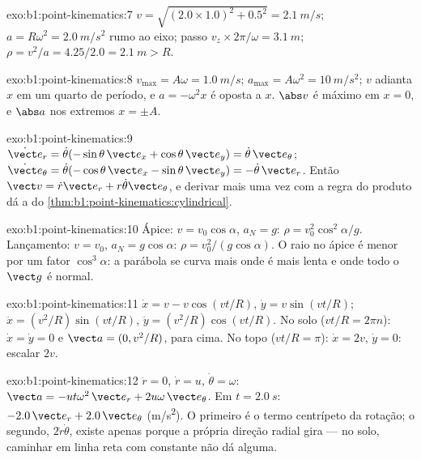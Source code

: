 \begin{solution}{exo:b1:point-kinematics:7}
$v = \sqrt{(2.0 \times 1.0)^2 + 0.5^2} = \qty{2.1}{m/s}$; $a = R\omega^2 =
\qty{2.0}{m/s^2}$ rumo ao eixo; passo $v_z \times 2\pi/\omega =
\qty{3.1}{m}$; $\rho = v^2/a = 4.25/2.0 = \qty{2.1}{m} > R$.
\end{solution}

\begin{solution}{exo:b1:point-kinematics:8}
$v_{\max} = A\omega = \qty{1.0}{m/s}$; $a_{\max} = A\omega^2 = \qty{10}{m/s^2}$;
$v$ adianta $x$ em um quarto de período, e $a = -\omega^2x$ é oposta a $x$.
$\abs v$ é máximo em $x = 0$, e $\abs a$ nos extremos $x = \pm A$.
\end{solution}

\begin{solution}{exo:b1:point-kinematics:9}
$\dot{\vect e}_r = \dot\theta(-\sin\theta\,\vect e_x + \cos\theta\,\vect e_y)
= \dot\theta\,\vect e_\theta$; $\dot{\vect e}_\theta = \dot\theta(-\cos\theta\,
\vect e_x - \sin\theta\,\vect e_y) = -\dot\theta\,\vect e_r$. Então
$\vect v = \dot r\vect e_r + r\dot\theta\vect e_\theta$, e derivar
mais uma vez com a regra do produto dá a  do
\cref{thm:b1:point-kinematics:cylindrical}.
\end{solution}

\begin{solution}{exo:b1:point-kinematics:10}
Ápice: $v = v_0\cos\alpha$, $a_N = g$: $\rho = v_0^2\cos^2\alpha/g$.
Lançamento: $v = v_0$, $a_N = g\cos\alpha$: $\rho = v_0^2/(g\cos\alpha)$.
O raio no ápice é menor por um fator $\cos^3\alpha$: a parábola se curva mais
onde é mais lenta e onde todo o $\vect g$ é normal.
\end{solution}

\begin{solution}{exo:b1:point-kinematics:11}
$\dot x = v - v\cos(vt/R)$, $\dot y = v\sin(vt/R)$; $\ddot x = (v^2/R)
\sin(vt/R)$, $\ddot y = (v^2/R)\cos(vt/R)$. No solo ($vt/R = 2\pi n$):
$\dot x = \dot y = 0$ e $\vect a = (0, v^2/R)$, para cima. No topo
($vt/R = \pi$): $\dot x = 2v$, $\dot y = 0$:  escalar $2v$.
\end{solution}

\begin{solution}{exo:b1:point-kinematics:12}
$\ddot r = 0$, $\dot r = u$, $\dot\theta = \omega$: $\vect a = -ut\omega^2\,
\vect e_r + 2u\omega\,\vect e_\theta$. Em $t = \qty{2.0}{s}$: $-2.0\,\vect e_r
+ 2.0\,\vect e_\theta$ (\unit{m/s^2}). O primeiro é o termo centrípeto
da rotação; o segundo, $2\dot r\dot\theta$, existe apenas porque a
própria direção radial gira --- no solo, caminhar em linha reta com
 constante não dá  alguma.
\end{solution}

